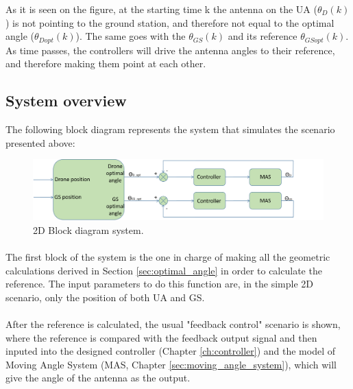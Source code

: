 As it is seen on the figure, at the starting time k the antenna on the UA ($\theta_{D} (k)$) is not pointing to the ground station, and therefore not equal to the optimal angle ($\theta_{Dopt}(k)$). The same goes with the $\theta_{GS}(k)$ and its reference $\theta_{GSopt}(k)$. As time passes, the controllers will drive the antenna angles to their reference, and therefore making them point at each other. 

\subsection*{System overview}
The following block diagram represents the system that simulates the scenario presented above:
\begin{figure}[H]
	\centering
	\includegraphics[scale=0.50]{figures/2d_system.png}
	\caption{2D Block diagram system.}
	\label{fig:2d_system}
\end{figure}

\paragraph{} The first block of the system is the one in charge of making all the geometric calculations derived in Section \ref{sec:optimal_angle} in order to calculate the reference. The input parameters to do this function are, in the simple 2D scenario, only the position of both UA and GS.

\paragraph{} After the reference is calculated, the usual "feedback control" scenario is shown, where the reference is compared with the feedback output signal and then inputed into the designed controller (Chapter \ref{ch:controller}) and the model of Moving Angle System (MAS, Chapter \ref{sec:moving_angle_system}), which will give the angle of the antenna as the output.


